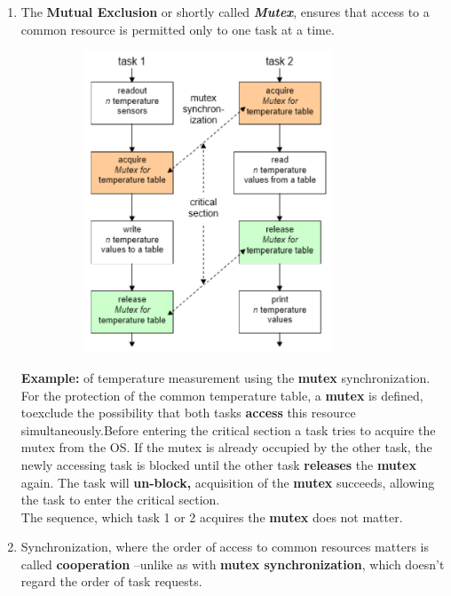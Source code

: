 \begin{enumerate}
\item The \textbf{Mutual Exclusion }or shortly called \textbf{\textit{Mutex}}, ensures that access to a common resource is permitted only to one task at a time. 

 	\begin{figure}[h]
    \centering
    \includegraphics[width=9cm, height=9cm]{Images/image103.png}
    \label{fig:Fig 49}
    \end{figure}

\textbf{Example:} of temperature measurement using the \textbf{mutex} synchronization.\\

\textbf{ }For the protection of the common temperature table, a \textbf{mutex} is defined, toexclude the possibility that both tasks \textbf{access} this resource simultaneously.Before entering the critical section a task tries to acquire the mutex from the OS. If the mutex is already occupied by the other task, the newly accessing task is blocked\textbf{\textit{ }}until the other task \textbf{releases} the \textbf{mutex} again. The task will \textbf{un-block,} acquisition of the \textbf{mutex} succeeds, allowing the task to enter the critical section.\\

The sequence, which task 1 or 2 acquires the \textbf{mutex} does not matter.

\item Synchronization, where the order of access to common resources matters is called \textbf{cooperation} --unlike as with\textbf{ mutex synchronization}, which doesn't regard the order of task requests.


\end{enumerate}
